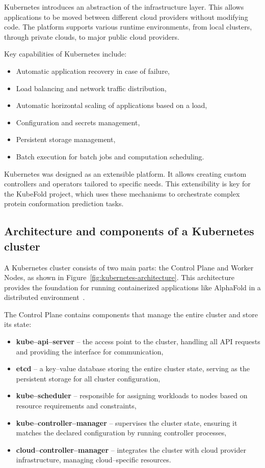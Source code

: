 Kubernetes introduces an abstraction of the infrastructure layer.
This allows applications to be moved between different cloud providers without modifying code.
The platform supports various runtime environments, from local clusters, through private clouds, to major public cloud providers.

Key capabilities of Kubernetes include:
\begin{itemize}
    \item Automatic application recovery in case of failure,
    \item Load balancing and network traffic distribution,
    \item Automatic horizontal scaling of applications based on a load,
    \item Configuration and secrets management,
    \item Persistent storage management,
    \item Batch execution for batch jobs and computation scheduling.
\end{itemize}

Kubernetes was designed as an extensible platform.
It allows creating custom controllers and operators tailored to specific needs.
This extensibility is key for the KubeFold project, which uses these mechanisms to orchestrate complex protein conformation prediction tasks.

\subsection{Architecture and components of a Kubernetes cluster}

A Kubernetes cluster consists of two main parts: the Control Plane and Worker Nodes, as shown in Figure~\ref{fig:kubernetes-architecture}.
This architecture provides the foundation for running containerized applications like AlphaFold in a distributed environment~\cite{kubernetes}.

The Control Plane contains components that manage the entire cluster and store its state:
\begin{itemize}
    \item \textbf{kube--api--server} -- the access point to the cluster, handling all API requests and providing the interface for communication,
    \item \textbf{etcd} -- a key--value database storing the entire cluster state, serving as the persistent storage for all cluster configuration,
    \item \textbf{kube--scheduler} -- responsible for assigning workloads to nodes based on resource requirements and constraints,
    \item \textbf{kube--controller--manager} -- supervises the cluster state, ensuring it matches the declared configuration by running controller processes,
    \item \textbf{cloud--controller--manager} -- integrates the cluster with cloud provider infrastructure, managing cloud--specific resources.
\end{itemize}

